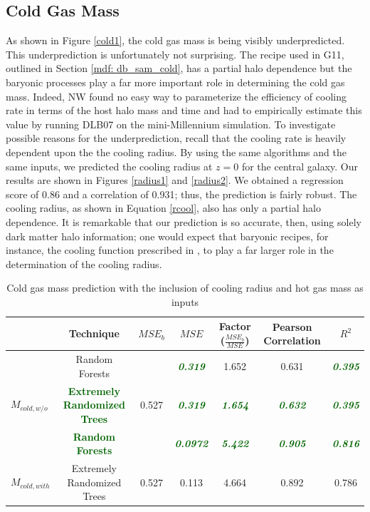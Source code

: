 \documentclass[a4paper,fleqn,usenatbib]{mnras}
\begin{document}
\subsection{Cold Gas Mass} \label{results_cold}
As shown in Figure \ref{cold1}, the cold gas mass is being visibly underpredicted. This underprediction is unfortunately not surprising. The recipe used in G11, outlined in Section \ref{mdf: db_sam_cold}, has a partial halo dependence but the baryonic processes play a far more important role in determining the cold gas mass. Indeed, NW found no easy way to parameterize the efficiency of cooling rate in terms of the host halo mass and time and had to empirically estimate this value by running DLB07 on the mini-Millennium simulation. To investigate possible reasons for the underprediction, recall that the cooling rate is heavily dependent upon the the cooling radius. By using the same algorithms and the same inputs, we predicted the cooling radius at $z=0$ for the central galaxy. Our results are shown in Figures \ref{radius1} and \ref{radius2}. We obtained a regression score of $0.86$ and a correlation of 0.931; thus, the prediction is fairly robust. The cooling radius, as shown in Equation \ref{rcool}, also has only a partial halo dependence. It is remarkable that our prediction is so accurate, then, using solely dark matter halo information; one would expect that baryonic recipes, for instance, the cooling function prescribed in \citet{sutherland1993cooling}, to play a far larger role in the determination of the cooling radius. 


\begin{table}
\begin{minipage}{159mm}
\caption{Cold gas mass prediction with the inclusion of cooling radius and hot gas mass as inputs}
 \label{cold_mse}
 \begin{tabular}{@{}lcccccc}
  \hline
  \hline
   & Technique & $MSE_b$ & $MSE$ & Factor ($\frac{MSE_b}{MSE}$) & Pearson Correlation
         & $R^2$\\
  \hline
  & Random Forests &  & \textcolor{darkgreen}{\textbf{\textit{0.319}}} & 1.652 & 0.631 & \textcolor{darkgreen}{\textbf{\textit{0.395}}} \\
  \multirow{-2}{*}{$M_{cold,w/o}$} & \textcolor{darkgreen}{\textbf{Extremely Randomized Trees}} & \multirow{-2}{*}{0.527} & \textcolor{darkgreen}{\textit{\textbf{0.319}}} & \textcolor{darkgreen}{\textbf{\textit{1.654}}} & \textcolor{darkgreen}{\textbf{\textit{0.632}}} & \textcolor{darkgreen}{\textbf{\textit{0.395}}}\\
  \hline 
  & \textcolor{darkgreen}{\textbf{Random Forests}} &  & \textcolor{darkgreen}{\textbf{\textit{0.0972}}} & \textcolor{darkgreen}{\textbf{\textit{5.422}}} & \textcolor{darkgreen}{\textbf{\textit{0.905}}} & \textcolor{darkgreen}{\textbf{\textit{0.816}}}\\
  \multirow{-2}{*}{$M_{cold,with}$} & Extremely Randomized Trees & \multirow{-2}{*}{0.527}& 0.113 & 4.664 & 0.892 & 0.786 \\
  \hline
 \end{tabular}
 \end{minipage}
\end{table}
\end{document}
